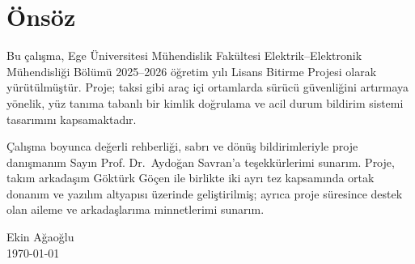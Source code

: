 \chapter*{Önsöz}

Bu çalışma, Ege Üniversitesi Mühendislik Fakültesi Elektrik--Elektronik
Mühendisliği Bölümü 2025--2026 öğretim yılı Lisans Bitirme Projesi olarak
yürütülmüştür. Proje; taksi gibi araç içi ortamlarda sürücü güvenliğini
artırmaya yönelik, yüz tanıma tabanlı bir kimlik doğrulama ve acil durum
bildirim sistemi tasarımını kapsamaktadır.

Çalışma boyunca değerli rehberliği, sabrı ve dönüş bildirimleriyle proje
danışmanım Sayın Prof. Dr.\ Aydoğan Savran'a teşekkürlerimi sunarım.
Proje, takım arkadaşım Göktürk Göçen ile birlikte iki ayrı tez kapsamında
ortak donanım ve yazılım altyapısı üzerinde geliştirilmiş; ayrıca proje
süresince destek olan aileme ve arkadaşlarıma minnetlerimi sunarım.

\vspace{1cm}
\noindent
\begin{flushright}
Ekin Ağaoğlu \\
\today
\end{flushright}
\cleardoublepage
